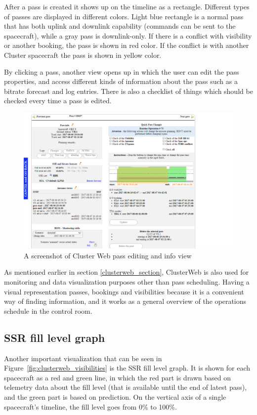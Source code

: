 After a pass is created it shows up on the timeline as a rectangle. Different types of passes are displayed in different colors. Light blue rectangle is a normal pass that has both uplink and downlink capability (commands can be sent to the spacecraft), while a gray pass is downlink-only. If there is a conflict with visibility or another booking, the pass is shown in red color. If the conflict is with another Cluster spacecraft the pass is shown in yellow color.

By clicking a pass, another view opens up in which the user can edit the pass properties, and access different kinds of information about the pass such as a bitrate forecast and log entries. There is also a checklist of things which should be checked every time a pass is edited.

\begin{figure}[ht]
  \begin{center}
    \includegraphics*[width=1\textwidth]{clusterweb_pass_edit}
  \end{center}
  \caption{A screenshot of Cluster Web pass editing and info view}
  \label{fig:clusterweb_pass_edit}
\end{figure}

As mentioned earlier in section \ref{clusterweb_section}, ClusterWeb is also used for monitoring and data visualization purposes other than pass scheduling. Having a visual representation passes, bookings and visibilities because it is a convenient way of finding information, and it works as a general overview of the operations schedule in the control room.

\subsection{SSR fill level graph}
Another important visualization that can be seen in Figure~\ref{fig:clusterweb_visibilities} is the SSR fill level graph. It is shown for each spacecraft as a red and green line, in which the red part is drawn based on telemetry data about the fill level (that is available until the end of latest pass), and the green part is based on prediction. On the vertical axis of a single spacecraft's timeline, the fill level goes from 0\% to 100\%.

